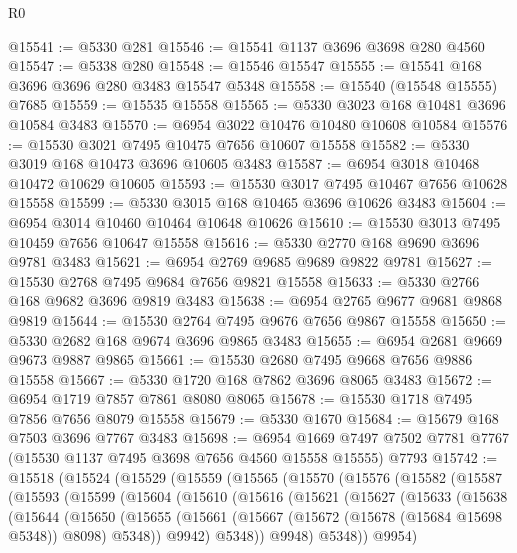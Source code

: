 \begin{lexlean}{R0}
\begin{coremodule}
@15541 := @5330 @281
@15546 := @15541 @1137 @3696 @3698 @280 @4560
@15547 := @5338 @280
@15548 := @15546 @15547
@15555 := @15541 @168 @3696 @3696 @280 @3483 @15547 @5348
@15558 := @15540 (@15548 @15555) @7685
@15559 := @15535 @15558
@15565 := @5330 @3023 @168 @10481 @3696 @10584 @3483
@15570 := @6954 @3022 @10476 @10480 @10608 @10584
@15576 := @15530 @3021 @7495 @10475 @7656 @10607 @15558
@15582 := @5330 @3019 @168 @10473 @3696 @10605 @3483
@15587 := @6954 @3018 @10468 @10472 @10629 @10605
@15593 := @15530 @3017 @7495 @10467 @7656 @10628 @15558
@15599 := @5330 @3015 @168 @10465 @3696 @10626 @3483
@15604 := @6954 @3014 @10460 @10464 @10648 @10626
@15610 := @15530 @3013 @7495 @10459 @7656 @10647 @15558
@15616 := @5330 @2770 @168 @9690 @3696 @9781 @3483
@15621 := @6954 @2769 @9685 @9689 @9822 @9781
@15627 := @15530 @2768 @7495 @9684 @7656 @9821 @15558
@15633 := @5330 @2766 @168 @9682 @3696 @9819 @3483
@15638 := @6954 @2765 @9677 @9681 @9868 @9819
@15644 := @15530 @2764 @7495 @9676 @7656 @9867 @15558
@15650 := @5330 @2682 @168 @9674 @3696 @9865 @3483
@15655 := @6954 @2681 @9669 @9673 @9887 @9865
@15661 := @15530 @2680 @7495 @9668 @7656 @9886 @15558
@15667 := @5330 @1720 @168 @7862 @3696 @8065 @3483
@15672 := @6954 @1719 @7857 @7861 @8080 @8065
@15678 := @15530 @1718 @7495 @7856 @7656 @8079 @15558
@15679 := @5330 @1670
@15684 := @15679 @168 @7503 @3696 @7767 @3483
@15698 := @6954
    @1669
    @7497
    @7502
    @7781
    @7767
    (@15530 @1137 @7495 @3698 @7656 @4560 @15558 @15555)
    @7793
@15742 := @15518
    (@15524
      (@15529
        (@15559
          (@15565
            (@15570
              (@15576
                (@15582
                  (@15587
                    (@15593
                      (@15599
                        (@15604
                          (@15610
                            (@15616
                              (@15621
                                (@15627
                                  (@15633
                                    (@15638
                                      (@15644
                                        (@15650
                                          (@15655
                                            (@15661
                                              (@15667
                                                (@15672 (@15678 (@15684 @15698 @5348)) @8098)
                                                @5348))
                                            @9942)
                                          @5348))
                                      @9948)
                                    @5348))
                                @9954)

\end{coremodule}
\end{lexlean}
